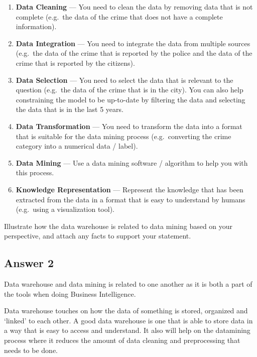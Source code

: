 \documentclass[
  11pt, %
]{assignment}
\begin{document}
\begin{enumerate}
	\item \textbf{Data Cleaning} --- You need to clean the data by removing data that is not complete (e.g.\ the data of the crime that does not have a complete information).
	\item \textbf{Data Integration} --- You need to integrate the data from multiple sources (e.g.\ the data of the crime that is reported by the police and the data of the crime that is reported by the citizens).
	\item \textbf{Data Selection} --- You need to select the data that is relevant to the question (e.g.\ the data of the crime that is in the city). You can also help constraining the model to be up-to-date by filtering the data and selecting the data that is in the last 5 years.
	\item \textbf{Data Transformation} --- You need to transform the data into a format that is suitable for the data mining process (e.g.\ converting the crime category into a numerical data / label).
	\item \textbf{Data Mining} --- Use a data mining software / algorithm to help you with this process.
	\item \textbf{Knowledge Representation} --- Represent the knowledge that has been extracted from the data in a format that is easy to understand by humans (e.g.\ using a visualization tool).
\end{enumerate}

\begin{problem}
Illustrate how the data warehouse is related to data mining based on your perspective, and attach any facts to support your statement.
\end{problem}

\subsection*{Answer 2}

Data warehouse and data mining is related to one another as it is both a part of the tools when doing Business Intelligence.

Data warehouse touches on how the data of something is stored, organized and `linked' to each other. A good data warehouse is one that is able to store data in a way that is easy to access and understand. It also will help on the datamining process where it reduces the amount of data cleaning and preprocessing that needs to be done.
\end{document}
